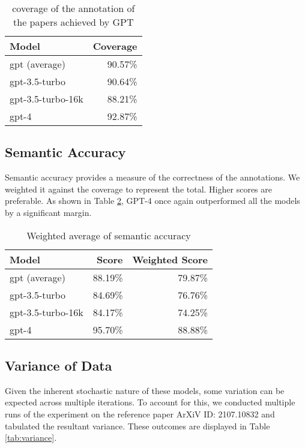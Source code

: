 \begin{table}[htpb]
  \centering
  \begin{tabular}{lr}
    \hline
    Model & Coverage \\
    \hline
    gpt (average) & 90.57\% \\
    gpt-3.5-turbo & 90.64\% \\
    gpt-3.5-turbo-16k & 88.21\% \\
    gpt-4 & 92.87\% \\
    \hline
  \end{tabular}
  \caption[Total coverage]{coverage of the annotation of the papers achieved by GPT}
  \label{tab:anno-percentage}
\end{table}

\subsection{Semantic Accuracy}
Semantic accuracy provides a measure of the correctness of the annotations. We weighted it against the coverage to represent the total. Higher scores are preferable. As shown in Table \ref{tab:semantic-accuracy}, GPT-4 once again outperformed all the models by a significant margin.

\begin{table}[htpb]
  \centering
  \begin{tabular}{lrr}
    \hline
    Model & Score & Weighted Score \\
    \hline
    gpt (average) & 88.19\% & 79.87\% \\
    gpt-3.5-turbo & 84.69\% & 76.76\% \\
    gpt-3.5-turbo-16k & 84.17\% & 74.25\% \\
    gpt-4 & 95.70\% & 88.88\% \\
    \hline
  \end{tabular}
  \caption[Semantic Accuracy]{Weighted average of semantic accuracy}
  \label{tab:semantic-accuracy}
\end{table}

\subsection{Variance of Data}
Given the inherent stochastic nature of these models, some variation can be expected across multiple iterations. To account for this, we conducted multiple runs of the experiment on the reference paper ArXiV ID: 2107.10832 \citep{singleton2021logic} and tabulated the resultant variance. These outcomes are displayed in Table \ref{tab:variance}.

